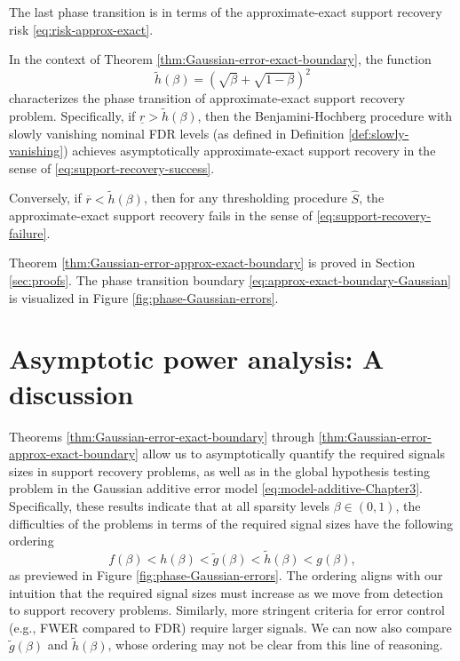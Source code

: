 The last phase transition is in terms of the approximate-exact support recovery risk
\eqref{eq:risk-approx-exact}.

\begin{theorem} \label{thm:Gaussian-error-approx-exact-boundary}
In the context of Theorem \ref{thm:Gaussian-error-exact-boundary}, the function 
\begin{equation} \label{eq:approx-exact-boundary-Gaussian}
    \widetilde{h}(\beta) = \left(\sqrt{\beta} + \sqrt{1-\beta}\right)^2
\end{equation}
characterizes the phase transition of approximate-exact support recovery problem.
Specifically, if $\underline{r} > \widetilde{h}(\beta)$, then the Benjamini-Hochberg procedure with slowly vanishing nominal FDR levels (as defined in Definition \ref{def:slowly-vanishing}) achieves asymptotically approximate-exact support recovery in the sense of \eqref{eq:support-recovery-success}. 

Conversely, if $\overline{r} < \widetilde{h}(\beta)$, then for any thresholding procedure $\widehat{S}$, the approximate-exact support recovery fails in the sense of \eqref{eq:support-recovery-failure}.
\end{theorem}

Theorem \ref{thm:Gaussian-error-approx-exact-boundary} is proved in Section \ref{sec:proofs}.
The phase transition boundary \eqref{eq:approx-exact-boundary-Gaussian} is visualized in Figure \ref{fig:phase-Gaussian-errors}.


\section{Asymptotic power analysis: A discussion}
\label{subsec:power-analysis}

 
Theorems \ref{thm:Gaussian-error-exact-boundary} through \ref{thm:Gaussian-error-approx-exact-boundary} allow us to asymptotically quantify the required signals sizes in support recovery problems, as well as in the global hypothesis testing problem in the Gaussian additive error model \eqref{eq:model-additive-Chapter3}. 
Specifically, these results indicate that at all sparsity levels $\beta\in(0,1)$, the difficulties of the problems in terms of the required signal sizes have the following ordering
$$
f(\beta) < h(\beta) < \widetilde{g}(\beta) < \widetilde{h}(\beta) < g(\beta),
$$
as previewed in Figure \ref{fig:phase-Gaussian-errors}.
The ordering aligns with our intuition that the required signal sizes must increase as we move from detection to support recovery problems.
Similarly, more stringent criteria for error control (e.g., FWER compared to FDR) require larger signals.
We can now also compare $\widetilde{g}(\beta)$ and $\widetilde{h}(\beta)$, whose ordering may not be clear from this line of reasoning.


